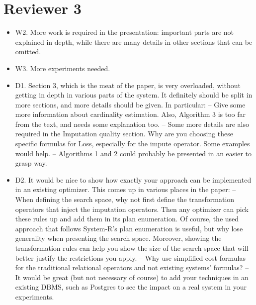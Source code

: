 \documentclass{vldb}
\newcommand{\resp}[1]{{\color{blue}{#1}}}
\begin{document}
  \section{Reviewer 3}
  \begin{itemize}[leftmargin=*]
  \item W2. More work is required in the presentation: important parts are not explained in depth, while there are many details in other sections that can be omitted.

  \item W3. More experiments needed.
  
  \resp{
  We've extended the evaluation section to include more impute operators and an evaluation of planning times.
  }

  \item D1. Section 3, which is the meat of the paper, is very overloaded, without getting in depth in various parts of the system. It definitely should be split in more sections, and more details should be given. In particular:
    -- Give some more information about cardinality estimation. Also, Algorithm 3 is too far from the text, and needs some explanation too.
    -- Some more details are also required in the Imputation quality section. Why are you choosing these specific formulas for Loss, especially for the impute operator. Some examples would help.
    -- Algorithms 1 and 2 could probably be presented in an easier to grasp way.
    
    \resp{
    We've broken up this section and consolidated algorithm notation. The cardinality estimation section provides more detail about the algorithm. We also
    added intuition for how the heuristic Penalty (a renaming of Loss, for clarity) and Time should be designed. We walk through these definitions for three different
    impute operators.
    }

  \item D2. It would be nice to show how exactly your approach can be implemented in an existing optimizer. This comes up in various places in the paper:
    -- When defining the search space, why not first define the transformation operators that inject the imputation operators. Then any optimizer can pick these rules up and add them in its plan enumeration. Of course, the used approach that follows System-R's plan enumeration is useful, but why lose generality when presenting the search space. Moreover, showing the transformation rules can help you show the size of the search space that will better justify the restrictions you apply.
    -- Why use simplified cost formulas for the traditional relational operators and not existing systems' formulas?
    -- It would be great (but not necessary of course) to add your techniques in an existing DBMS, such as Postgres to see the impact on a real system in your experiments.


\end{itemize}
\end{document}
